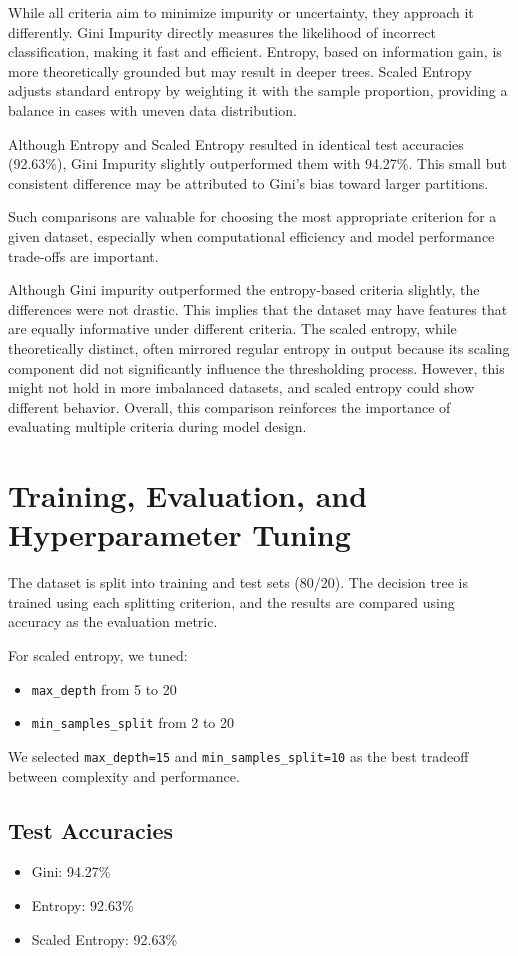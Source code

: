 \documentclass[11pt]{article}
\begin{document}
While all criteria aim to minimize impurity or uncertainty, they approach it differently. Gini Impurity directly measures the likelihood of incorrect classification, making it fast and efficient. Entropy, based on information gain, is more theoretically grounded but may result in deeper trees. Scaled Entropy adjusts standard entropy by weighting it with the sample proportion, providing a balance in cases with uneven data distribution.

Although Entropy and Scaled Entropy resulted in identical test accuracies (92.63\%), Gini Impurity slightly outperformed them with 94.27\%. This small but consistent difference may be attributed to Gini's bias toward larger partitions.

Such comparisons are valuable for choosing the most appropriate criterion for a given dataset, especially when computational efficiency and model performance trade-offs are important.

Although Gini impurity outperformed the entropy-based criteria slightly, the differences were not drastic. This implies that the dataset may have features that are equally informative under different criteria. The scaled entropy, while theoretically distinct, often mirrored regular entropy in output because its scaling component did not significantly influence the thresholding process. However, this might not hold in more imbalanced datasets, and scaled entropy could show different behavior. Overall, this comparison reinforces the importance of evaluating multiple criteria during model design.

\section{Training, Evaluation, and Hyperparameter Tuning}
The dataset is split into training and test sets (80/20). The decision tree is trained using each splitting criterion, and the results are compared using accuracy as the evaluation metric.

For scaled entropy, we tuned:
\begin{itemize}
    \item \texttt{max\_depth} from 5 to 20
    \item \texttt{min\_samples\_split} from 2 to 20
\end{itemize}

We selected \texttt{max\_depth=15} and \texttt{min\_samples\_split=10} as the best tradeoff between complexity and performance.

\subsection{Test Accuracies}
\begin{itemize}
    \item Gini: 94.27\%
    \item Entropy: 92.63\%
    \item Scaled Entropy: 92.63\%
\end{itemize}
\end{document}
